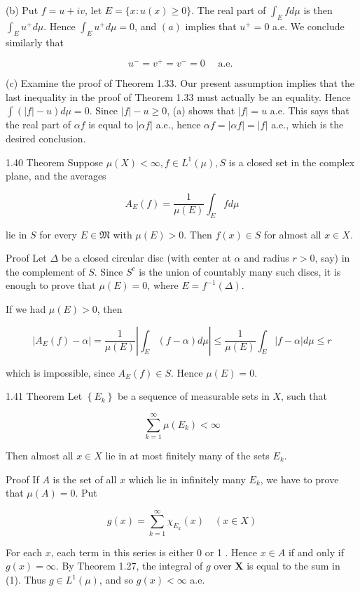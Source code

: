 \documentclass[10pt]{article}
\begin{document}
(b) Put $f=u+i v$, let $E=\{x: u(x) \geq 0\}$. The real part of $\int_{E} f d \mu$ is then $\int_{E} u^{+} d \mu$. Hence $\int_{E} u^{+} d \mu=0$, and $(a)$ implies that $u^{+}=0$ a.e. We conclude similarly that

$$
u^{-}=v^{+}=v^{-}=0 \quad \text { a.e. }
$$

(c) Examine the proof of Theorem 1.33. Our present assumption implies that the last inequality in the proof of Theorem 1.33 must actually be an equality. Hence $\int(|f|-u) d \mu=0$. Since $|f|-u \geq 0$, (a) shows that $|f|=u$ a.e. This says that the real part of $\alpha f$ is equal to $|\alpha f|$ a.e., hence $\alpha f=|\alpha f|=|f|$ a.e., which is the desired conclusion.

1.40 Theorem Suppose $\mu(X)<\infty, f \in L^{1}(\mu), S$ is a closed set in the complex plane, and the averages

$$
A_{E}(f)=\frac{1}{\mu(E)} \int_{E} f d \mu
$$

lie in $S$ for every $E \in \mathfrak{M}$ with $\mu(E)>0$. Then $f(x) \in S$ for almost all $x \in X$.

Proof Let $\Delta$ be a closed circular disc (with center at $\alpha$ and radius $r>0$, say) in the complement of $S$. Since $S^{c}$ is the union of countably many such discs, it is enough to prove that $\mu(E)=0$, where $E=f^{-1}(\Delta)$.

If we had $\mu(E)>0$, then

$$
\left|A_{E}(f)-\alpha\right|=\frac{1}{\mu(E)}\left|\int_{E}(f-\alpha) d \mu\right| \leq \frac{1}{\mu(E)} \int_{E}|f-\alpha| d \mu \leq r
$$

which is impossible, since $A_{E}(f) \in S$. Hence $\mu(E)=0$.

1.41 Theorem Let $\left\{E_{k}\right\}$ be a sequence of measurable sets in $X$, such that

$$
\sum_{k=1}^{\infty} \mu\left(E_{k}\right)<\infty
$$

Then almost all $x \in X$ lie in at most finitely many of the sets $E_{k}$.

Proof If $A$ is the set of all $x$ which lie in infinitely many $E_{k}$, we have to prove that $\mu(A)=0$. Put

$$
g(x)=\sum_{k=1}^{\infty} \chi_{E_{k}}(x) \quad(x \in X)
$$

For each $x$, each term in this series is either 0 or 1 . Hence $x \in A$ if and only if $g(x)=\infty$. By Theorem 1.27, the integral of $g$ over $\boldsymbol{X}$ is equal to the sum in (1). Thus $g \in L^{1}(\mu)$, and so $g(x)<\infty$ a.e.
\end{document}

